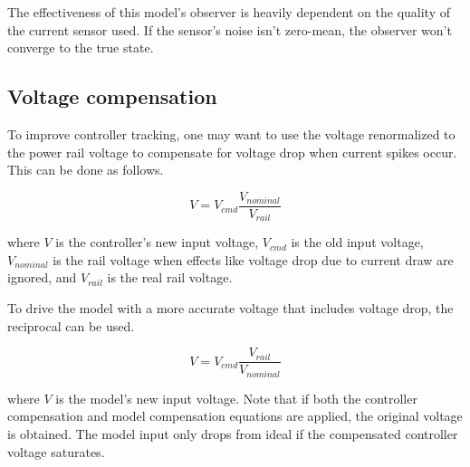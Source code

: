 The effectiveness of this \gls{model}'s \gls{observer} is heavily dependent on
the quality of the current sensor used. If the sensor's noise isn't zero-mean,
the \gls{observer} won't converge to the true \gls{state}.

\subsection{Voltage compensation}

To improve controller \gls{tracking}, one may want to use the voltage
renormalized to the power rail voltage to compensate for voltage drop when
current spikes occur. This can be done as follows.

\begin{equation}
  V = V_{cmd} \frac{V_{nominal}}{V_{rail}}
\end{equation}

where $V$ is the \gls{controller}'s new input voltage, $V_{cmd}$ is the old
input voltage, $V_{nominal}$ is the rail voltage when effects like voltage drop
due to current draw are ignored, and $V_{rail}$ is the real rail voltage.

To drive the \gls{model} with a more accurate voltage that includes voltage
drop, the reciprocal can be used.

\begin{equation}
  V = V_{cmd} \frac{V_{rail}}{V_{nominal}}
\end{equation}

where $V$ is the \gls{model}'s new input voltage. Note that if both the
\gls{controller} compensation and \gls{model} compensation equations are
applied, the original voltage is obtained. The \gls{model} input only drops from
ideal if the compensated \gls{controller} voltage saturates.
